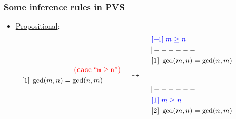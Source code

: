 \documentclass[10pt]{beamer}
\begin{document}

\begin{frame}
	\frametitle{Some inference rules in PVS}
\begin{itemize}
\item \underline{{\color{blue}Propositional}}:
{\small
\[\hspace{-1.2cm}\begin{array}{l}
     {\small{\tt{|------}}} \hspace{ 4mm}{\color{red}{\tt (case \;``m \geq n") }}\\[1mm]
    \,[1]\; \gcd(m,n) = \gcd(n,m)
  \end{array}         
  \hspace{.2cm}
  \begin{array}{c} \rightsquigarrow\end{array} 
\hspace{.2cm}
  \begin{array}{l}
    \,{\color{blue}[-\!1]\;  m \geq n} \\[1mm]
     {\small{\tt{|------}}} \\[1mm]
    \,[1]\; \gcd(m,n) = \gcd(n,m)\\[10mm]
     {\small{\tt{|------}}} \\[1mm]
    \,{\color{blue}[1]\;  m \geq n} \\[1mm]
    \,[2]\; \gcd(m,n) = \gcd(n,m)
  \end{array}      
  \]
}
\end{itemize}
\end{frame}

\end{document}
